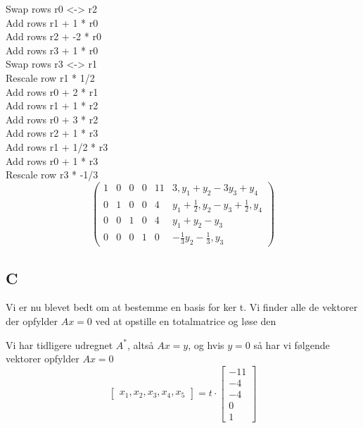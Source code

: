 \documentclass[11pt]{article}
\begin{document}
Swap rows r0 <-> r2\\
Add rows r1 + 1 * r0\\
Add rows r2 + -2 * r0\\
Add rows r3 + 1 * r0\\
Swap rows r3 <-> r1\\
Rescale row r1 * 1/2\\
Add rows r0 + 2 * r1\\
Add rows r1 + 1 * r2\\
Add rows r0 + 3 * r2\\
Add rows r2 + 1 * r3\\
Add rows r1 + 1/2 * r3\\
Add rows r0 + 1 * r3\\
Rescale row r3 * -1/3\\

\[
\left(\begin{array}{rrrrrr}
         1 & 0 & 0 & 0 & 11 & 3 , y_{1} + y_{2} - 3  y_{3} + y_{4} \\
         0 & 1 & 0 & 0 & 4 & y_{1} + \frac{1}{2} , y_{2} - y_{3} + \frac{1}{2} , y_{4} \\
         0 & 0 & 1 & 0 & 4 & y_{1} + y_{2} - y_{3} \\
         0 & 0 & 0 & 1 & 0 & -\frac{1}{3}  y_{2} - \frac{1}{3} , y_{3}
 \end{array}\right)
\]
    \hypertarget{c}{%
\subsection{C}\label{c}}

Vi er nu blevet bedt om at bestemme en basis for ker t. Vi finder alle
de vektorer der opfylder \(Ax=0\) ved at opstille en totalmatrice og
løse den

Vi har tidligere udregnet \(A^*\), altså \(Ax = y\), og hvis \(y = 0\)
så har vi følgende vektorer opfylder \(Ax=0\) \[ 
\begin{bmatrix}x_1,x_2,x_3,x_4,x_5\end{bmatrix} =  t\cdot \begin{bmatrix}-11\\-4\\-4\\0\\1\end{bmatrix}
\]
\end{document}
